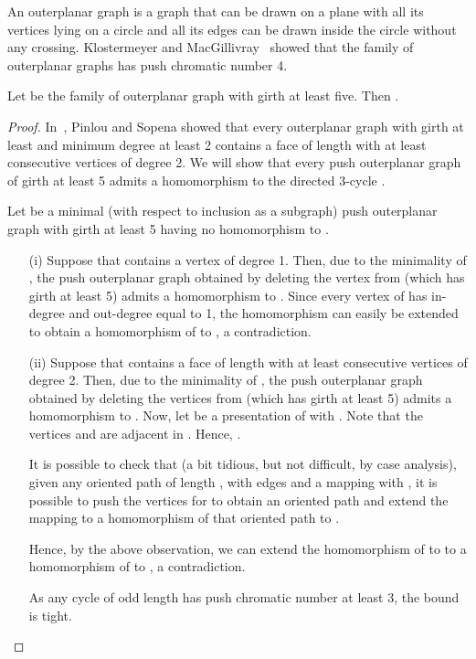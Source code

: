 \documentclass[10pt]{article}
\begin{document}
An outerplanar graph is a graph that can be drawn on a plane with all its vertices lying on a circle and all its edges can be drawn inside the circle without any crossing. Klostermeyer and MacGillivray~\cite{push} showed that the family of outerplanar graphs has 
push chromatic number 4. 


\begin{theorem}\mbox{}\label{pushouter}
Let  be the family of outerplanar graph with girth at least five. Then  .
\end{theorem}

\begin{proof}
In~\cite{outergirth}, Pinlou and Sopena showed that every outerplanar graph with girth at least 
and minimum degree at least 2 contains a face of length  with at least  consecutive vertices of degree 2.
We will show that every push outerplanar graph of girth at least 5 admits a homomorphism to the directed 3-cycle . 


Let  be a minimal (with respect to inclusion as a
subgraph) push outerplanar graph with girth at least 5 having no homomorphism to .

\begin{itemize}

\item[(i)]  Suppose that  contains a vertex  of degree 1. Then, due  to the minimality of 
, 
the push outerplanar graph obtained by deleting the vertex  from  (which has girth at least 5) admits a homomorphism to . 
Since every vertex of  has in-degree and out-degree equal to 1, the homomorphism can easily be extended to obtain a homomorphism of  to  , 
a contradiction.

\item[(ii)] Suppose that  contains a face  of length  with at least  consecutive vertices  of degree 2. Then, due  to the minimality of 
, 
the push outerplanar graph  obtained by deleting the vertices 
 from  (which has girth at least 5) admits a homomorphism  to . 
 Now, let  be a presentation of  with 
 . Note that 
 the vertices  and  are adjacent in . 
 Hence, . 

It is possible to check that (a bit tidious, but not difficult, by case analysis), given any oriented path of length , with edges  and a mapping 
 with , it is possible to push the vertices  for  to obtain an oriented path and extend the mapping  to a homomorphism of that oriented path to .

Hence, by the above observation, we can extend the homomorphism of  to  to a homomorphism of  to , 
a contradiction.

As any  cycle of odd length has push chromatic number at least 3, the  bound is tight. 
\end{itemize}
\end{proof}
\end{document}
